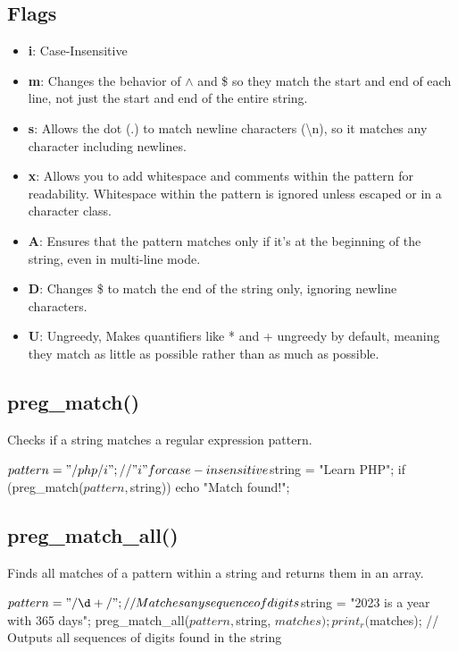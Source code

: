 \documentclass{report}
\begin{document}
\subsection{Flags}
\bigbreak \noindent 
\begin{itemize}
    \item \textbf{i}: Case-Insensitive
    \item \textbf{m}: Changes the behavior of $\land $ and \$ so they match the start and end of each line, not just the start and end of the entire string.
    \item \textbf{s}: Allows the dot (.) to match newline characters (\textbackslash n), so it matches any character including newlines.
    \item \textbf{x}: Allows you to add whitespace and comments within the pattern for readability. Whitespace within the pattern is ignored unless escaped or in a character class.
    \item \textbf{A}: Ensures that the pattern matches only if it’s at the beginning of the string, even in multi-line mode.
    \item \textbf{D}: Changes \$ to match the end of the string only, ignoring newline characters.
    \item \textbf{U}: Ungreedy, Makes quantifiers like * and + ungreedy by default, meaning they match as little as possible rather than as much as possible.
\end{itemize}



\bigbreak \noindent 
\subsection{preg\_match()}
\bigbreak \noindent 
 Checks if a string matches a regular expression pattern.
 \bigbreak \noindent 
 \begin{phpcode}
     $pattern = "/php/i"; // "i" for case-insensitive
     $string = "Learn PHP";
     if (preg_match($pattern, $string)) {
         echo "Match found!";
     }
 \end{phpcode}

 \bigbreak \noindent 
 \subsection{preg\_match\_all()}
 \bigbreak \noindent 
 Finds all matches of a pattern within a string and returns them in an array.
 \bigbreak \noindent 
 \begin{phpcode}
     $pattern = "/\d+/"; // Matches any sequence of digits
     $string = "2023 is a year with 365 days";
     preg_match_all($pattern, $string, $matches);
     print_r($matches); // Outputs all sequences of digits found in the string
 \end{phpcode}
 \bigbreak \noindent 
\end{document}
